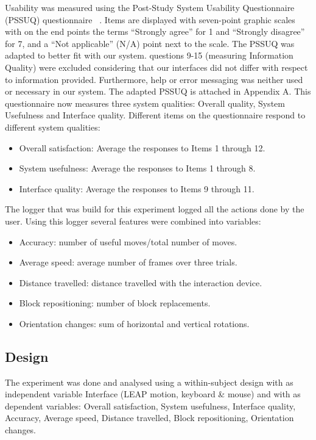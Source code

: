 Usability was measured using the Post-Study System Usability Questionnaire (PSSUQ) questionnaire ~\cite{lewis1992psychometric}. Items are displayed with seven-point graphic scales with on the end points the terms “Strongly agree” for 1 and “Strongly disagree” for 7, and a “Not applicable” (N/A) point next to the scale. The PSSUQ was adapted to better fit with our system. questions 9-15 (measuring Information Quality) were excluded considering that our interfaces did not differ with respect to information provided. Furthermore, help or error messaging was neither used or necessary in our system. The adapted PSSUQ is attached in Appendix A. This questionnaire now measures three system qualities: Overall quality, System Usefulness and Interface quality.  Different items on the questionnaire respond to different system qualities:
\begin{itemize}
	\item Overall satisfaction: Average the responses to Items 1 through 12.
	\item System usefulness: Average the responses to Items 1 through 8.
    \item Interface quality: Average the responses to Items 9 through 11.
\end{itemize}

The logger that was build for this experiment logged all the actions done by the user. Using this logger several features were combined into variables: 
\begin{itemize}
	\item Accuracy: number of useful moves/total number of moves.
	\item Average speed: average number of frames over three trials.    
	\item Distance travelled: distance travelled with the interaction device.
    \item Block repositioning: number of block replacements.
    \item Orientation changes: sum of horizontal and vertical rotations.
\end{itemize}


\subsection{Design}
The experiment was done and analysed using a within-subject design with as independent variable Interface (LEAP motion, keyboard \& mouse) and with as dependent variables: Overall satisfaction, System usefulness, Interface quality, Accuracy, Average speed, Distance travelled, Block repositioning, Orientation changes. 

